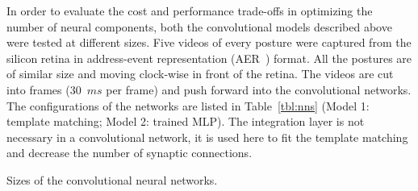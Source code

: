 \documentclass[journal]{journal}
\begin{document}
In order to evaluate the cost and performance trade-offs in optimizing the number of neural components, both the convolutional models described above were tested at different sizes. 
Five videos of every posture were captured from the silicon retina in address-event representation (AER~\cite{lazzaro1995multi}) format.  
All the postures are of similar size and moving clock-wise in front of the retina. 
The videos are cut into frames (30~$ms$ per frame) and push forward into the convolutional networks. 
The configurations of the networks are listed in Table~\ref{tbl:nns} (Model 1: template matching; Model 2: trained MLP). 
The integration layer is not necessary in a convolutional network, it is used here to fit the template matching and decrease the number of synaptic connections.

\begin{table}
\caption{Sizes of the convolutional neural networks.}
	\begin{subtable}{0.5\textwidth}
		

\end{subtable}
\end{table}
\end{document}
